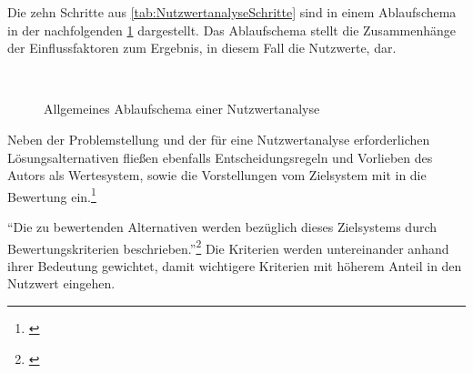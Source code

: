 Die zehn Schritte aus \cref{tab:NutzwertanalyseSchritte} sind in einem Ablaufschema in der nachfolgenden \cref{fig:NutzwertanalyseVorgehenBechmann} dargestellt. Das Ablaufschema stellt die Zusammenhänge der Einflussfaktoren zum Ergebnis, in diesem Fall die Nutzwerte, dar.

\newpage
\begin{figure}[hbt!]
	\centering
	\begin{minipage}[t]{0.7\textwidth}	
		\caption{Allgemeines Ablaufschema einer Nutzwertanalyse}
		\\ %
		\label{fig:NutzwertanalyseVorgehenBechmann}
	\end{minipage}
\end{figure}

Neben der Problemstellung und der für eine Nutzwertanalyse erforderlichen Lösungsalternativen fließen ebenfalls Entscheidungsregeln und Vorlieben des Autors als Wertesystem, sowie die Vorstellungen vom Zielsystem mit in die Bewertung ein.\footnote{\cite[vgl.][22\psq]{Bechmann1978}}

\enquote{Die zu bewertenden Alternativen werden bezüglich dieses Zielsystems durch Bewertungskriterien beschrieben.}\footnote{\cite[][26]{Bechmann1978}} Die Kriterien werden untereinander anhand ihrer Bedeutung gewichtet, damit wichtigere Kriterien mit höherem Anteil in den Nutzwert eingehen.

